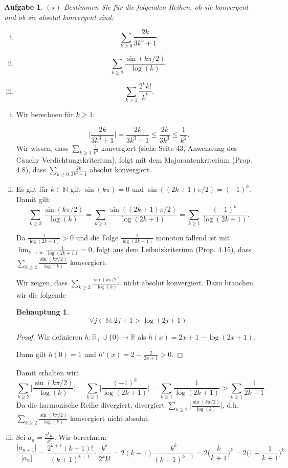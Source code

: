 \documentclass[a4paper, 20]{exam}
\newtheorem{ex}{Aufgabe}
\newtheorem{claim}{Behauptung}
\newcommand\NN{\mathbb{N}}
\begin{document}
\begin{ex}{$(\star)$}
Bestimmen Sie f\"ur die folgenden Reihen, ob sie konvergent und ob sie absolut konvergent sind:

\begin{enumerate}[i.)]
\item
$$\sum_{k\geq 0} \frac{2k}{3k^3+1}.$$

\item
$$\sum_{k\geq 2} \frac{\sin(k\pi/2)}{\log(k)}.$$

\item
$$\sum_{k\geq 1} \frac{2^k k!}{k^k}.$$

\end{enumerate}
\end{ex}
\begin{solution}
\begin{enumerate}[i.)]
\item
Wir berechnen f\"ur $k\geq 1$:

$$ \bigg\vert \frac{2k}{3k^3+1} \bigg\vert = \frac{2k}{3k^3+1}
\leq \frac{2k}{3k^3} \leq \frac{1}{k^2}.$$
Wir wissen, dass $\sum_{k\geq 1} \frac{1}{k^2}$ konvergiert (siehe Seite 43, Anwendung des Cauchy Verdichtungskriterium), folgt mit dem Majorantenkriterium (Prop. 4.8), dass $\sum_{k\geq 0} \frac{2k}{3k^3+1}$ absolut konvergiert.
\item
Es gilt f\"ur $k\in \NN$ gilt $\sin(k\pi)=0$ und $\sin((2k+1)\pi /2)=(-1)^k$. Damit gilt:
$$ \sum_{k\geq 2} \frac{\sin(k\pi/2)}{\log(k)} 
= \sum_{k\geq 1} \frac{\sin((2k+1)\pi/2)}{\log(2k+1)} 
= \sum_{k\geq 1} \frac{(-1)^k}{\log(2k+1)}.$$ 

Da $\frac{1}{\log(2k+1)}>0$ und die Folge $\frac{1}{\log(2k+1)}$ monoton fallend ist mit  $\lim_{k\rightarrow \infty} \frac{1}{\log(2k+1)}=0$, folgt aus dem Leibnizkriterium (Prop. 4.15), dass $\sum_{k\geq 2} \frac{\sin(k\pi/2)}{\log(k)}$ konvergiert.

Wir zeigen, dass $\sum_{k\geq 2} \frac{\sin(k\pi/2)}{\log(k)}$ nicht absolut konvergiert. Dazu brauchen wir die folgende
\begin{claim}
$$\forall j \in \NN: 2j +1 > \log(2j+1).$$
\end{claim}
\begin{proof}
Wir definieren $h: \mathbb{R}_+ \cup \{0\} \to \mathbb{R}$ als $h(x)= 2x+1-\log(2x+1)$. 

Dann gilt $h(0)=1$ und $h'(x)= 2 - \frac{2}{2x+1} >0$.
\end{proof}
Damit erhalten wir:
$$\sum_{k\geq 2} \bigg\vert \frac{\sin(k\pi/2)}{\log(k)} \bigg\vert
= \sum_{k\geq 1} \bigg\vert \frac{(-1)^k}{\log(2k+1)} \bigg\vert 
= \sum_{k\geq 1} \frac{1}{\log(2k+1)}
> \sum_{k\geq 1} \frac{1}{2k+1}.$$
Da die harmonische Reihe divergiert, divergiert $\sum_{k\geq 2} \bigg\vert \frac{\sin(k\pi/2)}{\log(k)} \bigg\vert$, d.h. $\sum_{k\geq 2} \frac{\sin(k\pi/2)}{\log(k)}$ konvergiert nicht absolut.
\item
Sei $a_n=\frac{2^{k}k!}{k^{k}}$. Wir berechnen:
$$ \frac{\vert a_{n+1} \vert}{\vert a_n \vert} 
= \frac{2^{k+1}(k+1)!}{(k+1)^{k+1}} \cdot \frac{k^{k}}{2^{k}k!}
= 2(k+1) \frac{k^k}{(k+1)^{k+1}} = 2 \bigg( \frac{k}{k+1} \bigg)^{k}
= 2 \bigg(1-\frac{1}{k+1}\bigg)^k$$


\end{enumerate}
\end{solution}
\end{document}
